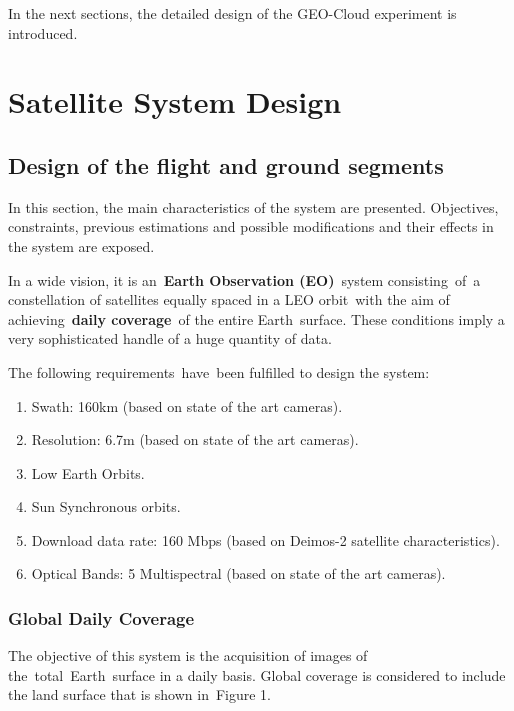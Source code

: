 \documentclass[a4paper]{article}
\newcounter{saveenum}
\newcommand\liststyleLFOiii{%
\renewcommand\theenumi{\arabic{enumi}}
\renewcommand\theenumii{\alph{enumii}}
\renewcommand\theenumiii{\roman{enumiii}}
\renewcommand\theenumiv{\arabic{enumiv}}
\renewcommand\labelenumi{\theenumi.}
\renewcommand\labelenumii{\theenumii.}
\renewcommand\labelenumiii{\theenumiii.}
\renewcommand\labelenumiv{\theenumiv.}
}
\begin{document}
\bigskip

In the next sections, the detailed design of the GEO-Cloud experiment is
introduced.

\section[Satellite System Design]{Satellite System Design}
\label{bkm:Ref378931876}\hypertarget{Toc381777185}{}
\bigskip

\subsection[Design of the flight and ground segments]{Design of the
flight and ground segments}
\hypertarget{Toc381777186}{}In this section, the main characteristics of
the system are presented. Objectives, constraints, previous estimations
and possible modifications and their effects in the system are exposed.


\bigskip

In a wide vision, it is an\ \textbf{Earth Observation (EO)}\ system
consisting\ of\ a constellation of satellites equally spaced in a LEO
orbit\ with the aim of achieving\ \textbf{daily coverage}\ of the
entire Earth\ surface. These conditions imply a very sophisticated
handle of a huge quantity of data.


\bigskip

The following requirements\ have\ been fulfilled to design the system:

\liststyleLFOiii
\setcounter{saveenum}{\value{enumi}}
\begin{enumerate}
\setcounter{enumi}{\value{saveenum}}
\item Swath: 160km (based on state of the art cameras).
\item Resolution: 6.7m (based on state of the art cameras).
\item Low Earth Orbits.
\item Sun Synchronous orbits.\ 
\item Download data rate: 160 Mbps (based on Deimos-2 satellite
characteristics).
\item Optical Bands: 5 Multispectral (based on state of the art
cameras).
\end{enumerate}

\bigskip


\bigskip

\subsubsection[Global Daily Coverage]{Global Daily Coverage}
\hypertarget{Toc381777187}{}The objective of this system is the
acquisition of images of the\ total\ Earth\ surface in a daily basis.
Global coverage is considered to include the land surface that is shown
in\ Figure 1.
\end{document}
